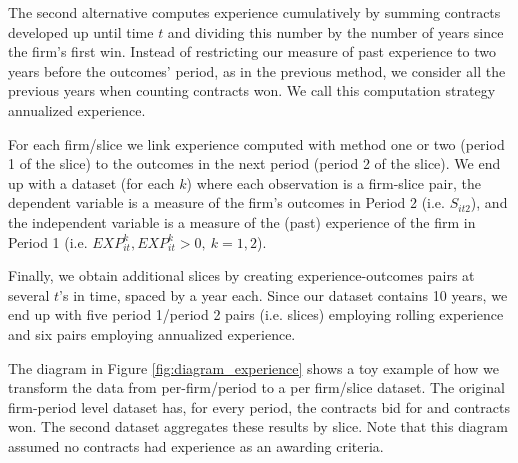 The second alternative computes experience cumulatively by summing contracts developed up until time $t$ and dividing this number by the number of years since the firm's first win. Instead of restricting our measure of past experience to two years before the outcomes' period, as in the previous method, we consider all the previous years when counting contracts won. We call this computation strategy annualized experience.

For each firm/slice we link experience computed with method one or two (period 1 of the slice) to the outcomes in the next period (period 2 of the slice). We end up with a dataset (for each $k$) where each observation is a firm-slice pair, the dependent variable is a measure of the firm’s outcomes in Period 2 (i.e. $S_{it2}$), and the independent variable is a measure of the (past) experience of the firm in Period 1 (i.e. $EXP^k_{it}, EXP^k_{it}>0,\ k=1,2$).

Finally, we obtain additional slices by creating experience-outcomes pairs at several $t$'s in time, spaced by a year each. Since our dataset contains 10 years, we end up with five period 1/period 2 pairs (i.e. slices) employing rolling experience and six pairs employing annualized experience.


The diagram in Figure \ref{fig:diagram_experience} shows a toy example of how we transform the data from per-firm/period to a per firm/slice dataset. The original firm-period level dataset has, for every period, the contracts bid for and contracts won. The second dataset aggregates these results by slice. Note that this diagram assumed no contracts had experience as an awarding criteria. %

